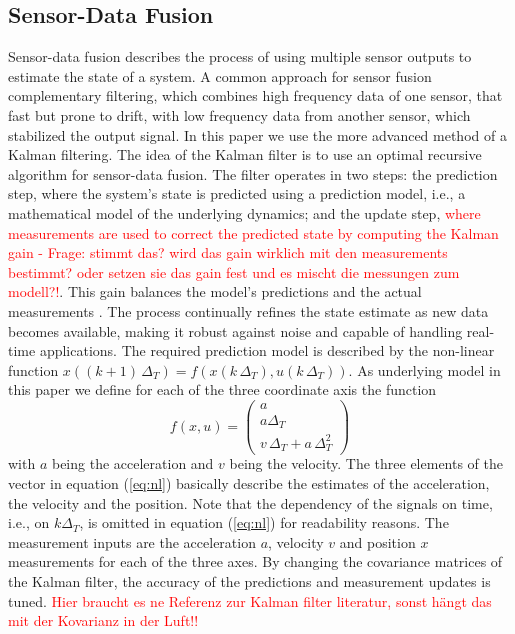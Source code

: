 \documentclass[engproc,conferenceproceedings,submit,pdftex,moreauthors]{Definitions/mdpi}
\begin{document}
\subsection{Sensor-Data Fusion}
Sensor-data fusion describes the process of using multiple sensor outputs to estimate the state of a system. A common approach for sensor fusion complementary filtering, which combines high frequency data of one sensor, that fast but prone to drift, with low frequency data from another sensor, which stabilized the output signal.
In this paper we use the more advanced method of a Kalman filtering. The idea of the Kalman filter is to use an optimal recursive algorithm  for sensor-data fusion. The filter operates in two steps: the prediction step, where the system's state  is predicted using a prediction model, i.e., a mathematical model of the underlying dynamics; and the update step, \textcolor{red}{where measurements are used to correct the predicted state by computing the Kalman gain - Frage: stimmt das? wird das gain wirklich mit den measurements bestimmt? oder setzen sie das gain fest und es mischt die messungen zum modell?!}. This gain balances the model's predictions and the actual measurements \cite{chui2009}. The process continually refines the state estimate as new data becomes available, making it robust against noise and capable of handling real-time applications. The required prediction model is described by  the non-linear function $x((k+1)\,\Delta_T) = f(x(k\,\Delta_T),u(k\,\Delta_T))$. As underlying model in this paper we define for each of the three coordinate  axis the function 
\begin{equation}\label{eq:nl}
	f(x,u) = \begin{pmatrix}
		a \\
		a \Delta_T   \\
		v \, \Delta_T   + a \, \Delta_T^2  
		\end{pmatrix}
\end{equation}
with $a$ being the acceleration and $v$ being the velocity. The three elements of the vector in equation (\ref{eq:nl}) basically describe the estimates of the  acceleration, the velocity and the position.
Note that the dependency of the signals on time, i.e., on $k\Delta_T$, is omitted in equation (\ref{eq:nl}) for readability reasons.
 The measurement inputs are the acceleration $a$, velocity $v$ and position $x$ measurements for each of the three axes. By changing the covariance matrices of the Kalman filter, the accuracy of the predictions and measurement updates is tuned. \textcolor{red}{Hier braucht es ne Referenz zur Kalman filter literatur, sonst hängt das mit der Kovarianz in der Luft!!} \\
\end{document}
